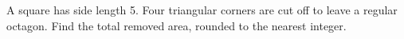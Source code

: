 A square has side length 5. Four triangular corners are cut off to leave a regular octagon. Find the total removed area, rounded to the nearest integer.
